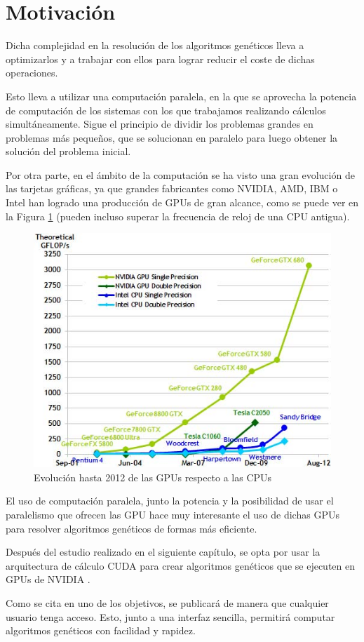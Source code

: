 \section{Motivación}
\bigskip

Dicha complejidad en la resolución de los algoritmos genéticos lleva a optimizarlos y a trabajar con ellos para lograr reducir el coste de dichas operaciones. 

Esto lleva a utilizar una computación paralela, en la que se aprovecha la potencia de computación de los sistemas con los que trabajamos realizando cálculos simultáneamente. Sigue el principio de dividir los problemas grandes en problemas más pequeños, que se solucionan en paralelo para luego obtener la solución del problema inicial.

Por otra parte, en el ámbito de la computación se ha visto una gran evolución de las tarjetas gráficas, ya que grandes fabricantes como NVIDIA, AMD, IBM o Intel han logrado una producción de GPUs de gran alcance, como se puede ver en la Figura \ref{fig:gpu_vs_cpu} (pueden incluso superar la frecuencia de reloj de una CPU antigua).

\bigskip
\begin{figure}[h]
	\centering
	\includegraphics[width=0.7\linewidth]{../images/gpu_vs_cpu}
	\caption[Evolución de las GPUs respecto a las CPUs]{Evolución hasta 2012 de las GPUs respecto a las CPUs}
	\label{fig:gpu_vs_cpu}
\end{figure}


\bigskip
El uso de computación paralela, junto la potencia y la posibilidad de usar el paralelismo que ofrecen las GPU  hace muy interesante el uso de dichas GPUs para resolver algoritmos genéticos de formas más eficiente.

Después del estudio realizado en el siguiente capítulo, se opta por usar la arquitectura de cálculo CUDA \cite{nvidiacuda} para crear algoritmos genéticos que se ejecuten en GPUs de NVIDIA \cite{nvidiadeveloper}.

Como se cita en uno de los objetivos, se publicará de manera que cualquier usuario tenga acceso. Esto, junto a una interfaz sencilla, permitirá computar algoritmos genéticos con facilidad y rapidez.




